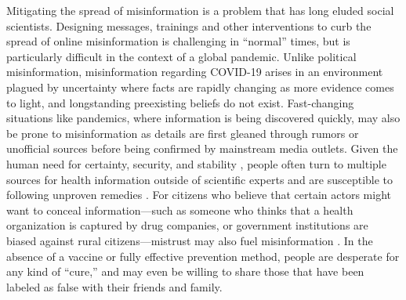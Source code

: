 \documentclass[letterpaper, 12pt, parskip=full,]{scrartcl}
\begin{document}
Mitigating the spread of misinformation is a problem that has long eluded social scientists. Designing messages, trainings and other interventions to curb the spread of online misinformation is challenging in ``normal'' times, but is particularly difficult in the context of a global pandemic. Unlike political misinformation, misinformation regarding COVID-19 arises in an environment plagued by uncertainty where facts are rapidly changing as more evidence comes to light, and longstanding preexisting beliefs do not exist. Fast-changing situations like pandemics, where information is being discovered quickly, may also be prone to misinformation as details are first gleaned through rumors or unofficial sources before being confirmed by mainstream media outlets. Given the human need for certainty, security, and stability \citep{leotti2010born}, people often turn to multiple sources for health information outside of scientific experts and are susceptible to following unproven remedies \citep{swire2020public}. For citizens who believe that certain actors might want to conceal information---such as someone who thinks that a health organization is captured by drug companies, or government institutions are biased against rural citizens---mistrust may also fuel misinformation \citep{vinck2019institutional}. In the absence of a vaccine or fully effective prevention method, people are desperate for any kind of ``cure,'' and may even be willing to share those that have been labeled as false with their friends and family. %




\end{document}
